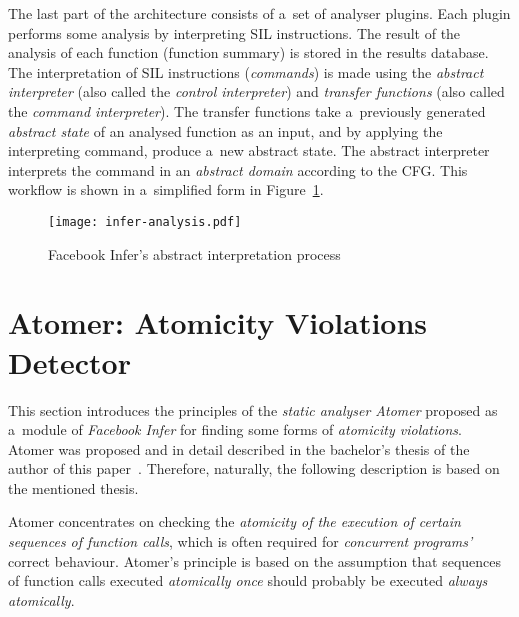 \documentclass{ExcelAtFIT}
\theoremstyle{definition}
\begin{document}
The last part of the architecture consists of a~set of analyser plugins. Each plugin performs some analysis by interpreting SIL instructions. The result of the analysis of each function (function summary) is stored in the results database. The interpretation of SIL instructions (\emph{commands}) is made using the \emph{abstract interpreter} (also called the \emph{control interpreter}) and \emph{transfer functions} (also called the \emph{command interpreter}). The transfer functions take a~previously generated \emph{abstract state} of an analysed function as an input, and by applying the interpreting command, produce a~new abstract state. The abstract interpreter interprets the command in an \emph{abstract domain} according to the CFG. This workflow is shown in a~simplified form in Figure~\ref{fig:inferAnalysis}.

\begin{figure}[hbt]
    \centering
    \texttt{[image: infer-analysis.pdf]}
    \caption{Facebook Infer's abstract interpretation process~\cite{harmimBP}}
    \label{fig:inferAnalysis}
\end{figure}


\section{\hspace{-.15em}Atomer: Atomicity Violations Detector}
\label{sec:atomer}

This section introduces the principles of the \emph{static analyser Atomer} proposed as a~module of \emph{Facebook Infer} for finding some forms of \emph{atomicity violations}. Atomer was proposed and in detail described in the bachelor's thesis of the author of this paper~\cite{harmimBP}. Therefore, naturally, the following description is based on the mentioned thesis.

Atomer concentrates on checking the \emph{atomicity of the execution of certain sequences of function calls}, which is often required for \emph{concurrent programs'} correct behaviour. Atomer's principle is based on the assumption that sequences of function calls executed \emph{atomically once} should probably be executed \emph{always atomically}.
\end{document}
